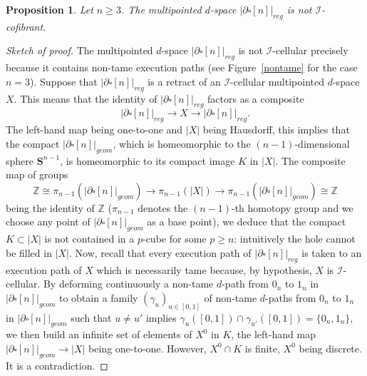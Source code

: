 \documentclass[a4paper,12pt]{amsart}
\newcommand{\de}{\partial}
\newtheorem{prop}[thm]{Proposition}
\newcommand{\bp}{\begin{prop}}
\newcommand{\ep}{\end{prop}}
\newcommand{\bpf}{\begin{proof}}
\newcommand{\epf}{\end{proof}}
\theoremstyle{definition}
\newcommand{\iso}{\cong}
\renewcommand{\geq}{\geqslant}
\begin{document}
\bp \label{nontractable}
Let $n\geq 3$. The multipointed $d$-space $|\de\square[n]|_{reg}$ is not $\mathcal{I}$-cofibrant.
\ep

\bpf[Sketch of proof]
The multipointed $d$-space $|\de\square[n]|_{reg}$ is not $\mathcal{I}$-cellular precisely because it contains non-tame execution paths (see Figure~\ref{nontame} for the case $n=3$). Suppose that $|\de\square[n]|_{reg}$ is a retract of an $\mathcal{I}$-cellular multipointed $d$-space $X$. This means that the identity of $|\de\square[n]|_{reg}$ factors as a composite \[|\de\square[n]|_{reg} \longrightarrow X \longrightarrow |\de\square[n]|_{reg}.\] The left-hand map being one-to-one and $|X|$ being Hausdorff, this implies that the compact $|\de\square[n]|_{geom}$, which is homeomorphic to the $(n-1)$-dimensional sphere $\mathbf{S}^{n-1}$, is homeomorphic to its compact image $K$ in $|X|$. The composite map of groups \[\mathbb{Z}\iso \pi_{n-1}(|\de\square[n]|_{geom}) \longrightarrow \pi_{n-1}(|X|) \longrightarrow \pi_{n-1}(|\de\square[n]|_{geom}) \iso \mathbb{Z}\] being the identity of $\mathbb{Z}$ ($\pi_{n-1}$ denotes the $(n-1)$-th homotopy group and we choose any point of $|\de\square[n]|_{geom}$ as a base point), we deduce that the compact $K\subset |X|$ is not contained in a $p$-cube for some $p\geq n$: intuitively the hole cannot be filled in $|X|$. Now, recall that every execution path of $|\de\square[n]|_{reg}$ is taken to an execution path of $X$ which is necessarily tame because, by hypothesis, $X$ is $\mathcal{I}$-cellular. By deforming continuously a non-tame $d$-path from $0_n$ to $1_n$ in $|\de\square[n]|_{geom}$ to obtain a family $(\gamma_u)_{u\in [0,1]}$ of non-tame $d$-paths from $0_n$ to $1_n$ in $|\de\square[n]|_{geom}$ such that $u\neq u'$ implies $\gamma_u([0,1]) \cap \gamma_{u'}([0,1]) =\{0_n,1_n\}$, we then build an infinite set of elements of $X^0$ in $K$, the left-hand map $|\de\square[n]|_{geom} \to |X|$ being one-to-one. However, $X^0 \cap K$ is finite, $X^0$ being discrete. It is a contradiction. 
\epf
\end{document}
